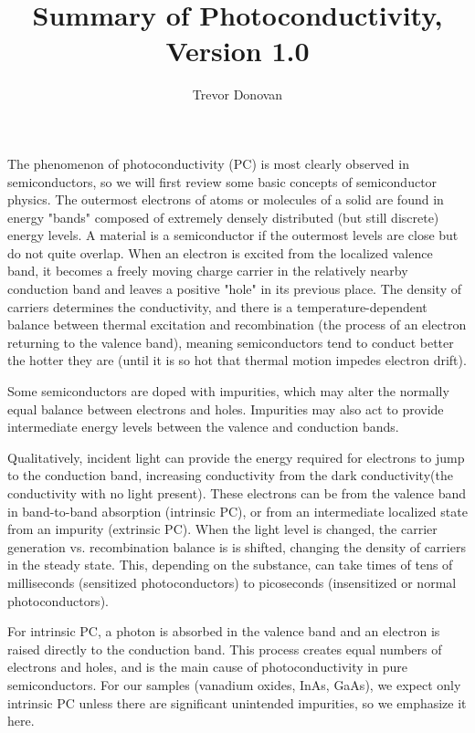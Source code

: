 \documentclass{article}
\title{\vspace{-2.5cm}Summary of Photoconductivity, Version 1.0}
\author{Trevor Donovan}
\date{}
\begin{document}
\maketitle





The phenomenon of photoconductivity (PC) is most clearly observed in semiconductors, so we will first review some basic concepts of semiconductor physics\parencite{boer23}. The outermost electrons of atoms or molecules of a solid are found in energy "bands" composed of extremely densely distributed (but still discrete) energy levels. A material is a semiconductor if the outermost levels are close but do not quite overlap. When an electron is excited from the localized valence band, it becomes a freely moving charge carrier in the relatively nearby conduction band and leaves a positive "hole" in its previous place. The density of carriers determines the conductivity, and there is a temperature-dependent balance between thermal excitation and recombination (the process of an electron returning to the valence band), meaning semiconductors tend to conduct better the hotter they are (until it is so hot that thermal motion impedes electron drift).

Some semiconductors are doped with impurities, which may alter the normally equal balance between electrons and holes. Impurities may also act to provide intermediate energy levels between the valence and conduction bands. 

Qualitatively, incident light can provide the energy required for electrons to jump to the conduction band, increasing conductivity from the dark conductivity(the conductivity with no light present). These electrons can be from the valence band in band-to-band absorption (intrinsic PC), or from an intermediate localized state from an impurity (extrinsic PC). When the light level is changed, the carrier generation vs. recombination balance is is shifted, changing the density of carriers in the steady state. This, depending on the substance, can take times of tens of milliseconds (sensitized photoconductors) to picoseconds (insensitized or normal photoconductors).

For intrinsic PC, a photon is absorbed in the valence band and an electron is raised directly to the conduction band. This process creates equal numbers of electrons and holes, and is the main cause of photoconductivity in pure semiconductors. For our samples (vanadium oxides, InAs, GaAs), we expect only intrinsic PC unless there are significant unintended impurities, so we emphasize it here.
\end{document}

